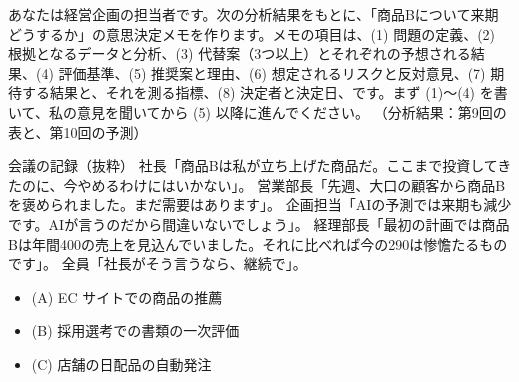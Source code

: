 \begin{promptbox}[意思決定メモの作成]
あなたは経営企画の担当者です。次の分析結果をもとに、「商品Bについて来期どうするか」の意思決定メモを作ります。メモの項目は、(1) 問題の定義、(2) 根拠となるデータと分析、(3) 代替案（3つ以上）とそれぞれの予想される結果、(4) 評価基準、(5) 推奨案と理由、(6) 想定されるリスクと反対意見、(7) 期待する結果と、それを測る指標、(8) 決定者と決定日、です。まず (1)〜(4) を書いて、私の意見を聞いてから (5) 以降に進んでください。
（分析結果：第9回の表と、第10回の予測）
\end{promptbox}

\begin{point}{会議の記録（抜粋）}
社長「商品Bは私が立ち上げた商品だ。ここまで投資してきたのに、今やめるわけにはいかない」。
営業部長「先週、大口の顧客から商品Bを褒められました。まだ需要はあります」。
企画担当「AIの予測では来期も減少です。AIが言うのだから間違いないでしょう」。
経理部長「最初の計画では商品Bは年間400の売上を見込んでいました。それに比べれば今の290は惨憺たるものです」。
全員「社長がそう言うなら、継続で」。
\end{point}

\begin{itemize}
  \item (A) EC サイトでの商品の推薦
  \item (B) 採用選考での書類の一次評価
  \item (C) 店舗の日配品の自動発注
\end{itemize}


